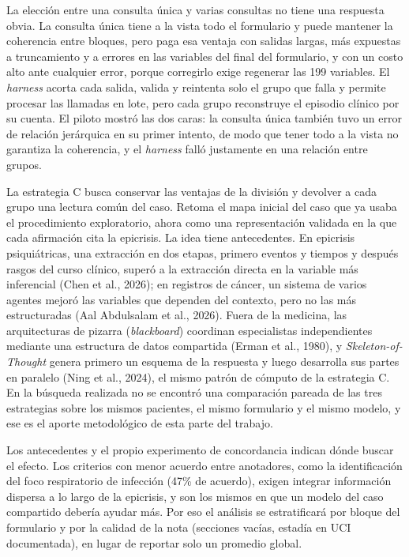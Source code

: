 \documentclass[12pt,letterpaper]{article}
\begin{document}
La elección entre una consulta única y varias consultas no tiene una respuesta obvia. La consulta única tiene a la vista todo el formulario y puede mantener la coherencia entre bloques, pero paga esa ventaja con salidas largas, más expuestas a truncamiento y a errores en las variables del final del formulario, y con un costo alto ante cualquier error, porque corregirlo exige regenerar las 199 variables. El \textit{harness} acorta cada salida, valida y reintenta solo el grupo que falla y permite procesar las llamadas en lote, pero cada grupo reconstruye el episodio clínico por su cuenta. El piloto mostró las dos caras: la consulta única también tuvo un error de relación jerárquica en su primer intento, de modo que tener todo a la vista no garantiza la coherencia, y el \textit{harness} falló justamente en una relación entre grupos.

La estrategia C busca conservar las ventajas de la división y devolver a cada grupo una lectura común del caso. Retoma el mapa inicial del caso que ya usaba el procedimiento exploratorio, ahora como una representación validada en la que cada afirmación cita la epicrisis. La idea tiene antecedentes. En epicrisis psiquiátricas, una extracción en dos etapas, primero eventos y tiempos y después rasgos del curso clínico, superó a la extracción directa en la variable más inferencial (Chen et al., 2026); en registros de cáncer, un sistema de varios agentes mejoró las variables que dependen del contexto, pero no las más estructuradas (Aal Abdulsalam et al., 2026). Fuera de la medicina, las arquitecturas de pizarra (\textit{blackboard}) coordinan especialistas independientes mediante una estructura de datos compartida (Erman et al., 1980), y \textit{Skeleton-of-Thought} genera primero un esquema de la respuesta y luego desarrolla sus partes en paralelo (Ning et al., 2024), el mismo patrón de cómputo de la estrategia C. En la búsqueda realizada no se encontró una comparación pareada de las tres estrategias sobre los mismos pacientes, el mismo formulario y el mismo modelo, y ese es el aporte metodológico de esta parte del trabajo.

Los antecedentes y el propio experimento de concordancia indican dónde buscar el efecto. Los criterios con menor acuerdo entre anotadores, como la identificación del foco respiratorio de infección (47\% de acuerdo), exigen integrar información dispersa a lo largo de la epicrisis, y son los mismos en que un modelo del caso compartido debería ayudar más. Por eso el análisis se estratificará por bloque del formulario y por la calidad de la nota (secciones vacías, estadía en UCI documentada), en lugar de reportar solo un promedio global.
\end{document}

